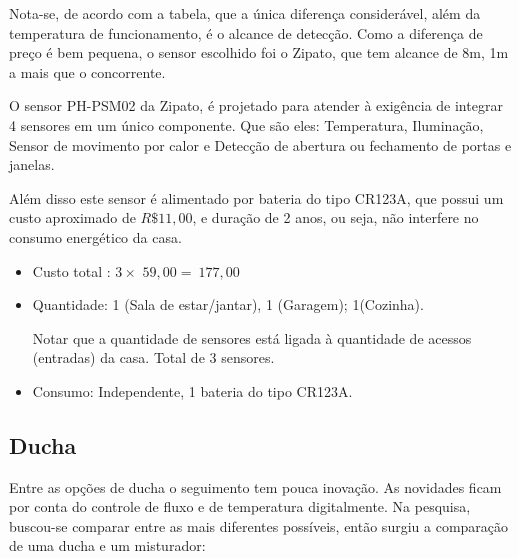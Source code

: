	Nota-se, de acordo com a tabela, que a única diferença considerável, além da temperatura de funcionamento, é o alcance de detecção. Como a diferença de preço é bem pequena, o sensor escolhido foi o Zipato\cite{MovimentoZWave}, que tem alcance de 8m, 1m a mais que o concorrente.

	O sensor PH-PSM02 da Zipato, é projetado para atender à exigência de integrar 4 sensores em um único componente. Que são eles: Temperatura, Iluminação, Sensor de movimento por calor e Detecção de abertura ou fechamento de portas e janelas.

	Além disso este sensor é alimentado por bateria do tipo CR123A, que possui um custo aproximado de $R\$ 11,00$\cite{BateriaPanasonic}, e duração de 2 anos, ou seja, não interfere no consumo energético da casa.

\begin{itemize}
\item Custo total : $3\times$ \texteuro$59,00 =\ $\texteuro$177,00$

\item Quantidade: 1 (Sala de estar/jantar), 1 (Garagem); 1(Cozinha).

Notar que a quantidade de sensores está ligada à quantidade de acessos (entradas) da casa. Total de 3 sensores.

\item Consumo: Independente, 1 bateria do tipo CR123A.
\end{itemize}

\subsection{Ducha}

	Entre as opções de ducha o seguimento tem pouca inovação. As novidades ficam por conta do controle de fluxo e de temperatura digitalmente. Na pesquisa, buscou-se comparar entre as mais diferentes possíveis, então surgiu a comparação de uma ducha e um misturador:


